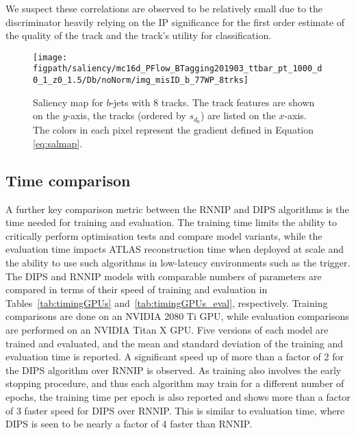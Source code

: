 We suspect these correlations are observed to be relatively small due to the discriminator heavily relying on the IP significance for the first order estimate of the quality of the track and the track's utility for classification.

\begin{figure}[htbp!]
    \centering
    \texttt{[image: \\figpath/saliency/mc16d\_PFlow\_BTagging201903\_ttbar\_pt\_1000\_d0\_1\_z0\_1.5/Db/noNorm/img\_misID\_b\_77WP\_8trks]}%
    \caption{Saliency map for $b$-jets with 8 tracks. The track features are shown on the $y$-axis, the tracks (ordered by $s_{d_0}$) are listed on the $x$-axis. The colors in each pixel represent the gradient defined in Equation \ref{eq:salmap}. }
    \label{fig:saliency}
\end{figure}


\subsection{Time comparison}
\label{subsec:timing}

A further key comparison metric between the RNNIP and DIPS algorithms is the time needed for training and evaluation. 
The training time limits the ability to critically perform optimisation tests and compare model variants, while the evaluation time impacts ATLAS reconstruction time when deployed at scale and the ability to use such algorithms in low-latency environments such as the trigger. 
The DIPS and RNNIP models with comparable numbers of parameters are compared in terms of their speed of training and evaluation in Tables~\ref{tab:timingGPUs} and~\ref{tab:timingGPUs_eval}, respectively. 
Training comparisons are done on an NVIDIA 2080 Ti GPU, while evaluation comparisons are performed on an NVIDIA Titan X GPU. 
Five versions of each model are trained and evaluated, and the mean and standard deviation of the training and evaluation time is reported. 
A significant speed up of more than a factor of 2 for the DIPS algorithm over RNNIP is observed. 
As training also involves the early stopping procedure, and thus each algorithm may train for a different number of epochs, the training time per epoch is also reported and shows more than a factor of 3 faster speed for DIPS over RNNIP. 
This is similar to evaluation time, where DIPS is seen to be nearly a factor of 4 faster than RNNIP.

